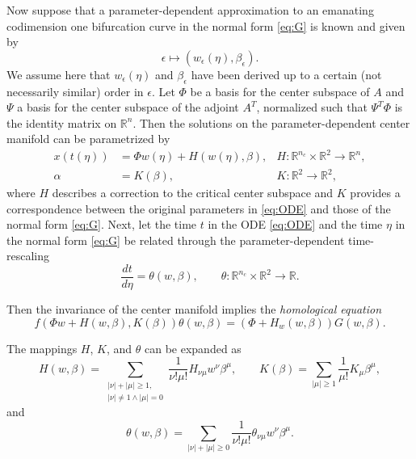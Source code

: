 Now suppose that a parameter-dependent approximation to an emanating
codimension one bifurcation curve in the normal form \cref{eq:G} is known and given by
\begin{equation}
    \label{eq:general_approximation} 
    \epsilon \mapsto (w_\epsilon(\eta), \beta_\epsilon).
\end{equation}
We assume here that $w_\epsilon(\eta)$ and $\beta_\epsilon$ have been derived
up to a certain (not necessarily similar) order in $\epsilon$. Let $\Phi$
be a basis for the center subspace of $A$ and $\Psi$ a basis for the center
subspace of the adjoint $A^T$, normalized such that $\Psi^T \Phi$ is the
identity matrix on $\mathbb R^n$. Then 
the solutions on the parameter-dependent center manifold can be
parametrized by 
\begin{align}
    \label{eq:H}
    x(t(\eta)) &= \Phi w(\eta) + H(w(\eta), \beta), 
               & H\colon\mathbb R^{n_c} \times \mathbb R^2 \to \mathbb R^n, \\
               \label{eq:K}
    \alpha &= K(\beta), 
           & K\colon\mathbb R^2 \to \mathbb R^2,
\end{align}
where $H$ describes a correction to the critical center subspace and $K$ provides a correspondence between the original parameters in \cref{eq:ODE} and those of the normal form \cref{eq:G}.
Next, let the time $t$ in the ODE \cref{eq:ODE} and the time $\eta$ in the normal form
\cref{eq:G} be related through the parameter-dependent time-rescaling
\begin{equation}
				\label{eq:theta}
				\frac{dt}{d\eta} = \theta(w, \beta), \qquad 
								\theta\colon \mathbb R^{n_c} \times \mathbb R^2 \to \mathbb R.
\end{equation}

Then the invariance of the center manifold implies the \emph{homological
equation}
\begin{equation}
    \label{eq:homological_equation}
    \tag{HOM}
    f(\Phi w + H(w,\beta), K(\beta)) \theta(w, \beta) = (\Phi + H_w(w, \beta)) G(w,\beta).
\end{equation}

The mappings $H$, $K$, and $\theta$ can be expanded as
\begin{equation}
    \label{eq:HK_expansion}
    H(w, \beta) = \sum_{\substack{|\nu|+|\mu| \geq 1, \\ |\nu|\neq 1 \wedge |\mu|=0}} \frac{1}{\nu!\mu!} H_{\nu\mu} w^\nu \beta^\mu,
    \qquad
    K(\beta) = \sum_{|\mu|\geq 1} \frac1{\mu!} K_\mu \beta^\mu,
\end{equation}
and
\begin{equation}
    \label{eq:theta_expansion}
    \theta(w, \beta) = \sum_{|\nu|+|\mu| \geq 0} \frac1{\nu!\mu!} \theta_{\nu\mu} w^\nu \beta^\mu.
\end{equation}

